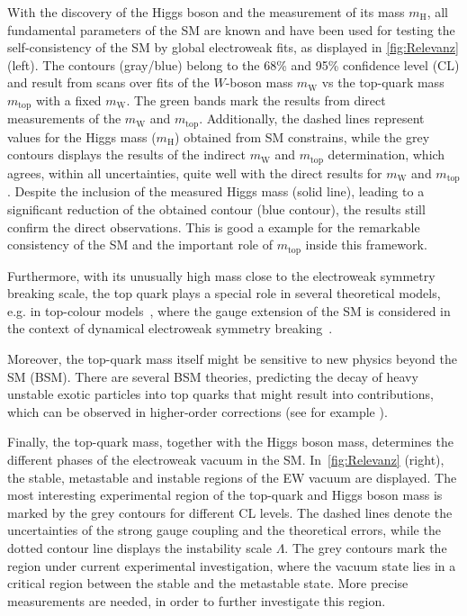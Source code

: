 With the discovery of the Higgs boson and the measurement of its mass $m_{\text{H}}$, all fundamental parameters of the SM are known and have been used for testing the self-consistency of the SM by global electroweak fits, as displayed in \cref*{fig:Relevanz} (left). The contours (gray/blue) belong to the 68\% and 95\% confidence level (CL) and result from scans  over fits of the $W$-boson mass $m_{\text{W}}$ vs the top-quark mass $m_{\text{top}}$ with a fixed $m_{\text{W}}$. The green bands mark the results from direct measurements of the $m_{\text{W}}$ and $m_{\text{top}}$. 
Additionally, the dashed lines represent values for the Higgs mass ($m_{\text{H}}$) obtained from SM constrains, while the grey contours displays the results of the indirect $m_{\text{W}}$ and $m_{\text{top}}$ determination, which agrees, within all uncertainties, quite well with the direct results for $m_{\text{W}}$ and $m_{\text{top}}$.
Despite the inclusion of the measured  Higgs mass (solid line), leading to a significant reduction of the obtained contour (blue contour), the results still confirm the direct observations. This is good a example for the remarkable consistency of the SM and the important role of $m_{\text{top}}$ inside this framework.~\cite{Baak:2012kk}



Furthermore, with its unusually high mass close to the electroweak symmetry breaking scale, the top quark plays a special role in several theoretical models, e.g. in top-colour models~\cite{Hill:1991at,Hill:1994hp}, where the  gauge extension of the SM is considered in the context of dynamical electroweak symmetry breaking~\cite{Bardeen:1989ds}. 

Moreover, the top-quark mass itself might be sensitive to new physics beyond the SM (BSM). There are several BSM theories, predicting the decay of heavy unstable exotic particles into top quarks that might result into contributions, which can be observed in higher-order corrections (see for example \cite{Kong:2014jwa}).


Finally, the top-quark mass, together with the Higgs boson mass, determines the different phases of the electroweak vacuum in the SM. In~\cref{fig:Relevanz} (right), the stable, metastable and instable regions of the EW vacuum are displayed.  The most interesting experimental region of the top-quark and Higgs boson mass is marked by the grey contours for different CL levels. The dashed lines denote the uncertainties of the strong gauge coupling and the theoretical errors, while the dotted contour line displays the instability scale $\Lambda$.
The grey contours mark the region under current experimental investigation, where the vacuum state lies in a critical region between the stable and the metastable state. More precise measurements are needed, in order to further investigate this region.~\cite{Buttazzo:2013uya}



